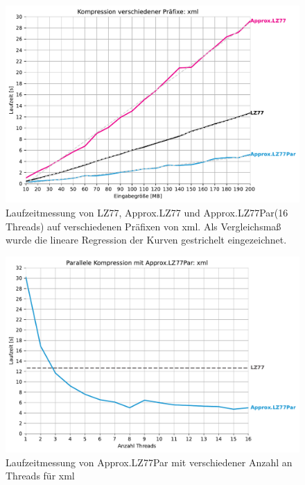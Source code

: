 \begin{figure}
    \centering
    \caption{Laufzeitmessung von LZ77, Approx.LZ77 und Approx.LZ77Par(16 Threads) auf verschiedenen Präfixen von xml. Als Vergleichsmaß wurde 
    die lineare Regression der Kurven gestrichelt eingezeichnet.}
    \includegraphics[scale=0.6]{Images/progressive_xml.pdf}
\end{figure}

\begin{figure}
    \centering
    \caption{Laufzeitmessung von Approx.LZ77Par mit verschiedener Anzahl an Threads für xml}
    \includegraphics[scale=0.6]{Images/progressive_speedup_xml.pdf}
\end{figure}
